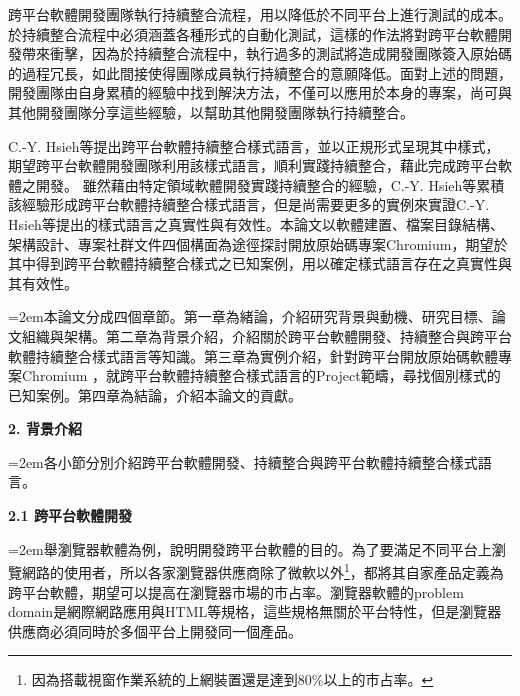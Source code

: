\documentclass[10pt, twocolumn]{article}
\begin{document}
跨平台軟體開發團隊執行持續整合流程，用以降低於不同平台上進行測試的成本。於持續整合流程中必須涵蓋各種形式的自動化測試，這樣的作法將對跨平台軟體開發帶來衝擊，因為於持續整合流程中，執行過多的測試將造成開發團隊簽入原始碼的過程冗長，如此間接使得團隊成員執行持續整合的意願降低\cite{teampace}。面對上述的問題，開發團隊由自身累積的經驗中找到解決方法，不僅可以應用於本身的專案，尚可與其他開發團隊分享這些經驗，以幫助其他開發團隊執行持續整合。

C.-Y. Hsieh等提出跨平台軟體持續整合樣式語言\cite{crossplatformcipatterns}，並以正規形式呈現其中樣式，期望跨平台軟體開發團隊利用該樣式語言，順利實踐持續整合，藉此完成跨平台軟體之開發。 雖然藉由特定領域軟體開發實踐持續整合的經驗，C.-Y. Hsieh等累積該經驗形成跨平台軟體持續整合樣式語言，但是尚需要更多的實例來實證C.-Y. Hsieh等提出的樣式語言之真實性與有效性。本論文以軟體建置、檔案目錄結構、架構設計、專案社群文件四個構面為途徑探討開放原始碼專案Chromium，期望於其中得到跨平台軟體持續整合樣式之已知案例，用以確定樣式語言存在之真實性與其有效性。 %

\parindent=2em本論文分成四個章節。第一章為緒論，介紹研究背景與動機、研究目標、論文組織與架構。第二章為背景介紹，介紹關於跨平台軟體開發、持續整合與跨平台軟體持續整合樣式語言等知識。第三章為實例介紹，針對跨平台開放原始碼軟體專案Chromium\cite{chromiumproject} ，就跨平台軟體持續整合樣式語言的Project範疇，尋找個別樣式的已知案例。第四章為結論，介紹本論文的貢獻。

\begin{raggedright}\textbf{2. 背景介紹}\end{raggedright}

\parindent=2em各小節分別介紹跨平台軟體開發、持續整合與跨平台軟體持續整合樣式語言。

\begin{raggedright}\textbf{2.1 跨平台軟體開發}\end{raggedright}

\parindent=2em舉瀏覽器軟體為例，說明開發跨平台軟體的目的。為了要滿足不同平台上瀏覽網路的使用者，所以各家瀏覽器供應商除了微軟以外\footnote{因為搭載視窗作業系統的上網裝置還是達到80\%以上的市占率。\cite{osmarketshare}}，都將其自家產品定義為跨平台軟體，期望可以提高在瀏覽器市場的市占率。瀏覽器軟體的problem domain\cite{problemdomain}是網際網路應用與HTML等規格，這些規格無關於平台特性，但是瀏覽器供應商必須同時於多個平台上開發同一個產品。
\end{document}
